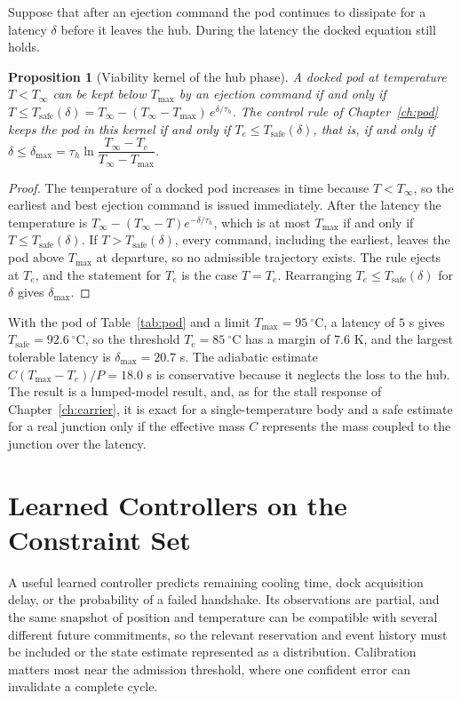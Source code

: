 \documentclass[11pt,openany]{book}
\theoremstyle{plain}
\newtheorem{proposition}[theorem]{Proposition}
\theoremstyle{definition}
\theoremstyle{remark}
\newcommand{\Tmax}{T_{\max}}
\begin{document}
Suppose that after an ejection command the pod continues to dissipate for a latency $\delta$ before it leaves the hub. During the latency the docked equation still holds.

\begin{proposition}[Viability kernel of the hub phase]
\label{prop:safe}
A docked pod at temperature $T<T_\infty$ can be kept below $\Tmax$ by an ejection command if and only if $T\le T_{\mathrm{safe}}(\delta)=T_\infty-(T_\infty-\Tmax)\,e^{\delta/\tau_h}$. The control rule of Chapter~\ref{ch:pod} keeps the pod in this kernel if and only if $T_e\le T_{\mathrm{safe}}(\delta)$, that is, if and only if $\delta\le\delta_{\max}=\tau_h\ln\dfrac{T_\infty-T_e}{T_\infty-\Tmax}$.
\end{proposition}
\begin{proof}
The temperature of a docked pod increases in time because $T<T_\infty$, so the earliest and best ejection command is issued immediately. After the latency the temperature is $T_\infty-(T_\infty-T)e^{-\delta/\tau_h}$, which is at most $\Tmax$ if and only if $T\le T_{\mathrm{safe}}(\delta)$. If $T>T_{\mathrm{safe}}(\delta)$, every command, including the earliest, leaves the pod above $\Tmax$ at departure, so no admissible trajectory exists. The rule ejects at $T_e$, and the statement for $T_e$ is the case $T=T_e$. Rearranging $T_e\le T_{\mathrm{safe}}(\delta)$ for $\delta$ gives $\delta_{\max}$.
\end{proof}

With the pod of Table~\ref{tab:pod} and a limit $\Tmax=95\ ^\circ$C, a latency of $5$ s gives $T_{\mathrm{safe}}=92.6\ ^\circ$C, so the threshold $T_e=85\ ^\circ$C has a margin of $7.6$ K, and the largest tolerable latency is $\delta_{\max}=20.7$ s. The adiabatic estimate $C(\Tmax-T_e)/P=18.0$ s is conservative because it neglects the loss to the hub. The result is a lumped-model result, and, as for the stall response of Chapter~\ref{ch:carrier}, it is exact for a single-temperature body and a safe estimate for a real junction only if the effective mass $C$ represents the mass coupled to the junction over the latency.


\section{Learned Controllers on the Constraint Set}

A useful learned controller predicts remaining cooling time, dock acquisition delay, or the probability of a failed handshake. Its observations are partial, and the same snapshot of position and temperature can be compatible with several different future commitments, so the relevant reservation and event history must be included or the state estimate represented as a distribution. Calibration matters most near the admission threshold, where one confident error can invalidate a complete cycle.
\end{document}
